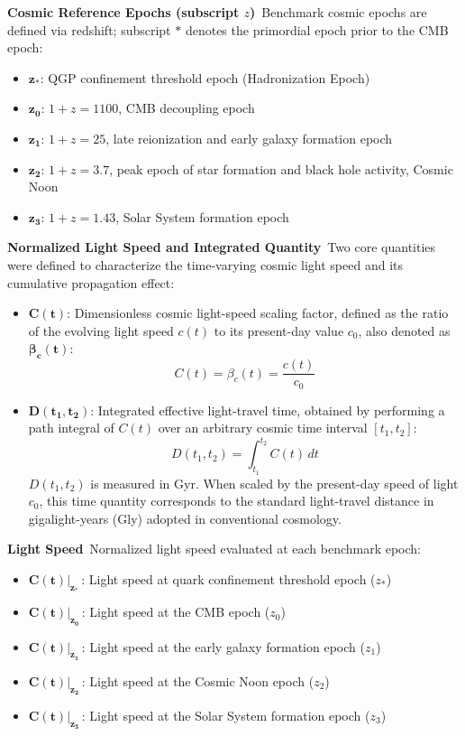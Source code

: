 \documentclass[12pt,leqno]{article}
\begin{document}
	\medskip
	\noindent
	
	{\bf Cosmic Reference Epochs (subscript $z$)}\,\,\,Benchmark cosmic epochs are defined via redshift; subscript $\boldsymbol*$ denotes the primordial epoch prior to the CMB epoch:
	\begin{itemize}
		\item $\boldsymbol{z_{*}}$: QGP confinement threshold epoch (Hadronization Epoch)
		\item $\boldsymbol{z_0}$: $1+z=1100$, CMB decoupling epoch
		\item $\boldsymbol{z_1}$: $1+z=25$, late reionization and early galaxy formation epoch
		\item $\boldsymbol{z_2}$: $1+z=3.7$, peak epoch of star formation and black hole activity, Cosmic Noon
		\item $\boldsymbol{z_3}$: $1+z=1.43$, Solar System formation epoch
	\end{itemize}
	
	\medskip
	\noindent
	
	{\bf Normalized Light Speed and Integrated Quantity}\,\,\,Two core quantities were defined to characterize the time-varying cosmic light speed and its cumulative propagation effect:
	\begin{itemize}
		\item $\boldsymbol{C(t)}$: Dimensionless cosmic light-speed scaling factor, defined as the ratio of the evolving light speed $c(t)$ to its present-day value $c_0$, also denoted as $\boldsymbol{\beta_{c}(t)}$:
		\[
		C(t) = \beta_{c}(t) = \dfrac{c(t)}{c_0}
		\]
		
		\item $\boldsymbol{D(t_1,t_2)}$: Integrated effective light-travel time, obtained by performing a path integral of $C(t)$ over an arbitrary cosmic time interval $[t_1, t_2]$:
		\[
		D(t_1,t_2) = \int_{t_1}^{t_2} C(t)\,dt
		\]
		$D(t_1,t_2)$ is measured in $\mathrm{Gyr}$. When scaled by the present-day speed of light $c_0$, this time quantity corresponds to the standard light-travel distance in gigalight-years (Gly) adopted in conventional cosmology.
		
	\end{itemize}
	
	\medskip
	\noindent
	
	{\bf Light Speed}\,\,\,Normalized light speed evaluated at each benchmark epoch:
	\begin{itemize}
		\item $\left.\boldsymbol{C(t)}\right|_{\boldsymbol{z_{*}}}$\,: Light speed at quark confinement threshold epoch ($z_{*}$)
		\item $\left.\boldsymbol{C(t)}\right|_{\boldsymbol{z_0}}$\,: Light speed at the CMB epoch ($z_0$)
		\item $\left.\boldsymbol{C(t)}\right|_{\boldsymbol{z_1}}$\,: Light speed at the early galaxy formation epoch ($z_1$)
		\item $\left.\boldsymbol{C(t)}\right|_{\boldsymbol{z_2}}$\,: Light speed at the Cosmic Noon epoch ($z_2$)
		\item $\left.\boldsymbol{C(t)}\right|_{\boldsymbol{z_3}}$\,: Light speed at the Solar System formation epoch ($z_3$)
	\end{itemize}
	
\end{document}
